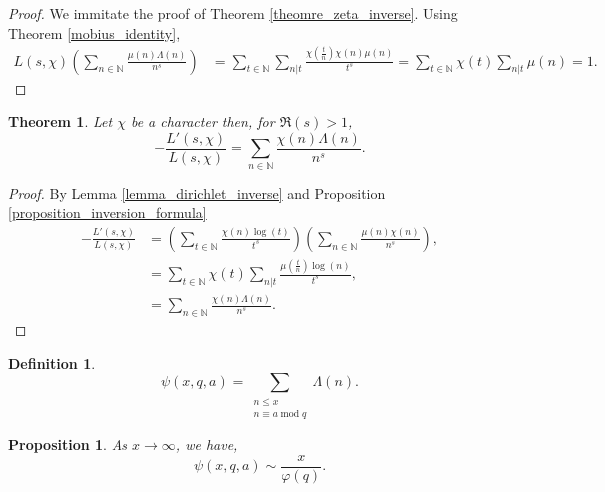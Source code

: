 \documentclass{article}
\newtheorem{theorem}{Theorem} [section]
\newtheorem{proposition}{Proposition}[section]
\newtheorem{definition}{Definition}[section]
\DeclareMathOperator{\tmod}{mod}
\newcommand{\N}[0]{\mathbb{N}}
\begin{document}
\begin{proof}
We immitate the proof of Theorem \ref{theomre_zeta_inverse}. Using Theorem \ref{mobius_identity},
\begin{align*}
  L(s,\chi)\left(\sum_{n\in\N}{\frac {\mu(n)\Lambda(n)} {n^s}}\right) & = \sum_{t\in\N}\sum_{n|t}{\frac {\chi\left({\frac t n}\right)\chi(n)\mu(n)} {t^s}} = \sum_{t\in\N}\chi(t)\sum_{n|t}\mu(n) = 1.
\end{align*}
\end{proof}

\begin{theorem}
  \label{theorem_L_inverse}
  Let $\chi$ be a character then, for $\Re(s)>1$,
  \begin{equation*}
    -{\frac {L'(s,\chi)} {L(s,\chi)}} = \sum_{n\in\N}{\frac {\chi(n)\Lambda(n)} {n^s}}.
  \end{equation*}
\end{theorem}

\begin{proof}
  By Lemma \ref{lemma_dirichlet_inverse} and Proposition \ref{proposition_inversion_formula}
  \begin{align*}
    -{\frac {L'(s,\chi)} {L(s,\chi)}} & = \left(\sum_{t\in\N}{\frac {\chi(n)\log(t)} {t^s}}\right)\left(\sum_{n\in\N}{\frac {\mu(n)\chi(n)} {n^s}}\right),\\
    & = \sum_{t\in\N}\chi(t)\sum_{n|t}{\frac {\mu\left({\frac t n}\right)\log(n)} {t^{s}}},\\
    & = \sum_{n\in\N}{\frac {\chi(n)\Lambda(n)} {n^s}}.
  \end{align*}
\end{proof}

\begin{definition}
  \begin{equation*}
    \psi(x,q,a) = \sum_{\substack{n\leq x\\ n\equiv a\tmod q}}\Lambda(n).
  \end{equation*}
\end{definition}

\begin{proposition}
  As $x\to\infty$, we have,
  \begin{equation*}
    \psi(x,q,a) \sim {\frac x {\varphi(q)}}.
  \end{equation*}
\end{proposition}
\end{document}

